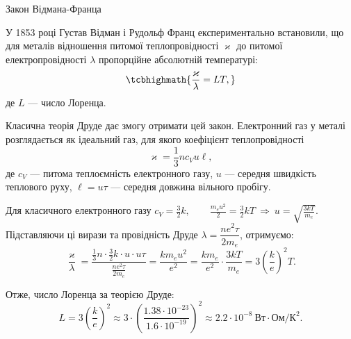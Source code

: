 \documentclass[onlytextwidth]{beamer}
\begin{document}
\begin{frame}{Закон Відмана-Франца}{}\footnotesize
	\begin{block}{}\justifying
		У 1853 році Густав Відман і Рудольф Франц експериментально встановили, що для металів
		відношення питомої теплопровідності $\varkappa$ до питомої електропровідності $\lambda$
		пропорційне абсолютній температурі:
		\begin{equation*}
			\tcbhighmath{\frac{\varkappa}{\lambda} = L T,}
		\end{equation*}
		де $L$ --- \alert{число Лоренца}.
	\end{block}
	\begin{block}{}\justifying
		Класична теорія Друде дає змогу отримати цей закон. Електронний газ у металі
		розглядається як ідеальний газ, для якого коефіцієнт теплопровідності
		\begin{equation*}
			\varkappa = \frac13 n c_V u \ell,
		\end{equation*}
		де $c_V$ --- питома теплоємність електронного газу, $u$ --- середня швидкість
		теплового руху, $\ell = u\tau$ --- середня довжина вільного пробігу.
	\end{block}
	\begin{overprint}
		\begin{block}{}\justifying
			Для класичного електронного газу
			\(
			c_V = \frac32 k,\qquad \frac{m_e u^2}{2} = \frac32 kT
			\ \Rightarrow\ u = \sqrt{\frac{3kT}{m_e}}.
			\)
			Підставляючи ці вирази та провідність Друде $\lambda = \dfrac{ne^2\tau}{2m_e}$, отримуємо:
			\begin{equation*}
				\frac{\varkappa}{\lambda}
				= \frac{\frac13 n \cdot \frac32 k \cdot u \cdot u\tau}{\frac{ne^2\tau}{2m_e}}
				= \frac{k m_e u^2}{e^2}
				= \frac{k m_e}{e^2}\cdot\frac{3kT}{m_e}
				= 3\left(\frac{k}{e}\right)^2 T.
			\end{equation*}
		\end{block}
		\begin{block}{}\justifying
			Отже, число Лоренца за теорією Друде:
			\begin{equation*}
				L = 3\left(\frac{k}{e}\right)^2
				\approx 3\cdot\left(\frac{1.38\cdot10^{-23}}{1.6\cdot10^{-19}}\right)^2
				\approx 2.2\cdot10^{-8}\ \text{Вт}\cdot\text{Ом}/\text{К}^2.
			\end{equation*}
		\end{block}
		\begin{block}{}\justifying

\end{block}
\end{overprint}
\end{frame}
\end{document}

